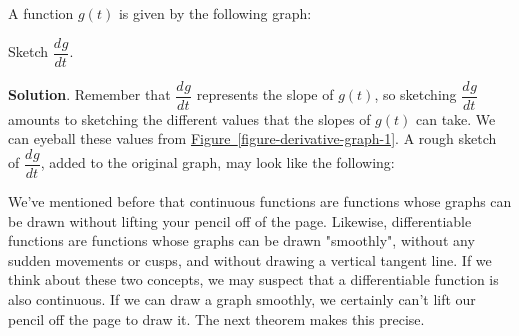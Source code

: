 \documentclass[10pt,]{book}
\theoremstyle{ptxplainnotitle}
\theoremstyle{ptxplaintitle}
\theoremstyle{ptxplainnotitle}
\theoremstyle{ptxplaintitle}
\theoremstyle{ptxplainnotitle}
\theoremstyle{ptxplaintitle}
\theoremstyle{ptxdefinitionnotitle}
\theoremstyle{ptxdefinitiontitle}
\theoremstyle{ptxdefinitionnotitle}
\theoremstyle{ptxdefinitiontitle}
\theoremstyle{ptxdefinitionnotitle}
\theoremstyle{ptxdefinitiontitle}
\theoremstyle{ptxdefinitionnotitle}
\theoremstyle{ptxdefinitiontitle}
\theoremstyle{ptxdefinitionnotitle}
\theoremstyle{ptxdefinitiontitle}
\numberwithin{equation}{section}
\newcommand{\dv}[3][]{\dfrac{d^{#1} #2}{d #3^{#1}}}
\begin{document}
\begin{example}\label{example-sketching-a-derivative}
\hypertarget{p-105}{}%
A function \(g(t)\) is given by the following graph: \begin{figure}
\centering
{
}
\end{figure}
%
\par
\hypertarget{p-106}{}%
Sketch \(\dv{g}{t}\).%
\par\smallskip%
\noindent\textbf{Solution}.\hypertarget{solution-23}{}\quad%
\hypertarget{p-107}{}%
Remember that \(\dv{g}{t}\) represents the slope of \(g(t)\), so sketching \(\dv{g}{t}\) amounts to sketching the different values that the slopes of \(g(t)\) can take. We can eyeball these values from \hyperref[figure-derivative-graph-1]{Figure~\ref{figure-derivative-graph-1}}. A rough sketch of \(\dv{g}{t}\), added to the original graph, may look like the following: \begin{figure}
\centering
{
}
\end{figure}
%
\end{example}
\hypertarget{p-108}{}%
We've mentioned before that continuous functions are functions whose graphs can be drawn without lifting your pencil off of the page. Likewise, differentiable functions are functions whose graphs can be drawn "smoothly", without any sudden movements or cusps, and without drawing a vertical tangent line. If we think about these two concepts, we may suspect that a differentiable function is also continuous. If we can draw a graph smoothly, we certainly can't lift our pencil off the page to draw it. The next theorem makes this precise.%
\end{document}
